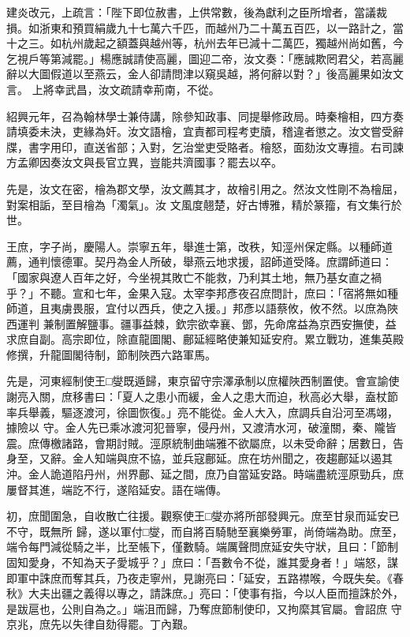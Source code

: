 \begin{pinyinscope}
 建炎改元，上疏言：「陛下即位赦書，上供常數，後為獻利之臣所增者，當議裁損。如浙東和預買絹歲九十七萬六千匹，而越州乃二十萬五百匹，以一路計之，當十之三。如杭州歲起之額蓋與越州等，杭州去年已減十二萬匹，獨越州尚如舊，今乞視戶等第減罷。」楊應誠請使高麗，圖迎二帝，汝文奏：「應誠欺罔君父，若高麗辭以大圖假道以至燕云，金人卻請問津以窺吳越，將何辭以對？」後高麗果如汝文言。
 上將幸武昌，汝文疏請幸荊南，不從。



 紹興元年，召為翰林學士兼侍講，除參知政事、同提舉修政局。時秦檜相，四方奏請填委未決，吏緣為奸。汝文語檜，宜責都司程考吏牘，稽違者懲之。汝文嘗受辭牒，書字用印，直送省部；入對，乞治堂吏受賂者。檜怒，面劾汝文專擅。右司諫方孟卿因奏汝文與長官立異，豈能共濟國事？罷去以卒。



 先是，汝文在密，檜為郡文學，汝文薦其才，故檜引用之。然汝文性剛不為檜屈，對案相詬，至目檜為「濁氣」。汝
 文風度翹楚，好古博雅，精於篆籀，有文集行於世。



 王庶，字子尚，慶陽人。崇寧五年，舉進士第，改秩，知涇州保定縣。以種師道薦，通判懷德軍。契丹為金人所破，舉燕云地求援，詔師道受降。庶謂師道曰：「國家與遼人百年之好，今坐視其敗亡不能救，乃利其土地，無乃基女直之禍乎？」不聽。宣和七年，金果入寇。太宰李邦彥夜召庶問計，庶曰：「宿將無如種師道，且夷虜畏服，宜付以西兵，使之入援。」邦彥以語蔡攸，攸不然。以庶為陜西運判
 兼制置解鹽事。疆事益棘，欽宗欲幸襄、鄧，先命席益為京西安撫使，益求庶自副。高宗即位，除直龍圖閣、鄜延經略使兼知延安府。累立戰功，進集英殿修撰，升龍圖閣待制，節制陜西六路軍馬。



 先是，河東經制使王□燮既遁歸，東京留守宗澤承制以庶權陜西制置使。會宣諭使謝亮入關，庶移書曰：「夏人之患小而緩，金人之患大而迫，秋高必大舉，盍杖節率兵舉義，驅逐渡河，徐圖恢復。」亮不能從。金人大入，庶調兵自沿河至馮翊，據險以
 守。金人先已乘冰渡河犯晉寧，侵丹州，又渡清水河，破潼關，秦、隴皆震。庶傳檄諸路，會期討賊。涇原統制曲端雅不欲屬庶，以未受命辭；居數日，告身至，又辭。金人知端與庶不協，並兵寇鄜延。庶在坊州聞之，夜趨鄜延以遏其沖。金人詭道陷丹州，州界鄜、延之間，庶乃自當延安路。時端盡統涇原勁兵，庶屢督其進，端訖不行，遂陷延安。語在端傳。



 初，庶聞圍急，自收散亡往援。觀察使王□燮亦將所部發興元。庶至甘泉而延安已不守，既無所
 歸，遂以軍付□燮，而自將百騎馳至襄樂勞軍，尚倚端為助。庶至，端令每門減從騎之半，比至帳下，僅數騎。端厲聲問庶延安失守狀，且曰：「節制固知愛身，不知為天子愛城乎？」庶曰：「吾數令不從，誰其愛身者！」端怒，謀即軍中誅庶而奪其兵，乃夜走寧州，見謝亮曰：「延安，五路襟喉，今既失矣。《春秋》大夫出疆之義得以專之，請誅庶。」亮曰：「使事有指，今以人臣而擅誅於外，是跋扈也，公則自為之。」端沮而歸，乃奪庶節制使印，又拘縻其官屬。會詔庶
 守京兆，庶先以失律自劾得罷。丁內艱。




\end{pinyinscope}
